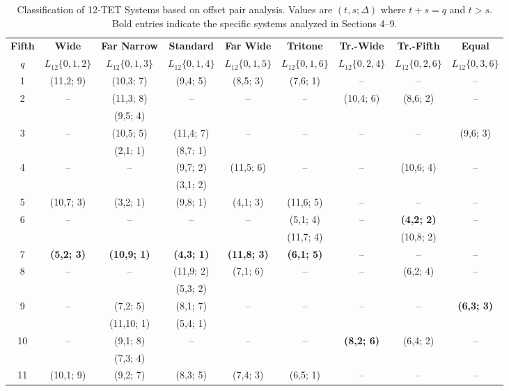 \documentclass[12pt,letterpaper]{amsart}
\begin{document}
\begin{table}[h!]
\centering
\scriptsize
\renewcommand{\arraystretch}{1.5}
\setlength{\tabcolsep}{2pt}
\begin{tabular}{|c||c|c|c|c|c|c|c|c|}
\hline
\textbf{Fifth} & \textbf{Wide} & \textbf{Far Narrow} & \textbf{Standard} & \textbf{Far Wide} & \textbf{Tritone} & \textbf{Tr.-Wide} & \textbf{Tr.-Fifth} & \textbf{Equal} \\
$q$ & $L_{12}\{0,1,2\}$ & $L_{12}\{0,1,3\}$ & $L_{12}\{0,1,4\}$ & $L_{12}\{0,1,5\}$ & $L_{12}\{0,1,6\}$ & $L_{12}\{0,2,4\}$ & $L_{12}\{0,2,6\}$ & $L_{12}\{0,3,6\}$ \\ \hline\hline
1 & (11,2; 9) & (10,3; 7) & (9,4; 5) & (8,5; 3) & (7,6; 1) & -- & -- & -- \\ \hline
2 & -- & (11,3; 8) & -- & -- & -- & (10,4; 6) & (8,6; 2) & -- \\
  &    & (9,5; 4)  &    &    &    &            &           &    \\ \hline
3 & -- & (10,5; 5) & (11,4; 7) & -- & -- & -- & -- & (9,6; 3) \\
  &    & (2,1; 1)   & (8,7; 1)  &    &    &    &    &          \\ \hline
4 & -- & -- & (9,7; 2) & (11,5; 6) & -- & -- & (10,6; 4) & -- \\
  &    &    & (3,1; 2) &           &    &    &           &    \\ \hline
5 & (10,7; 3) & (3,2; 1) & (9,8; 1) & (4,1; 3) & (11,6; 5) & -- & -- & -- \\ \hline
6 & -- & -- & -- & -- & (5,1; 4)  & --  & {\bf (4,2; 2)} & -- \\
  &    &    &    &    & (11,7; 4) &           & (10,8; 2) &    \\ \hline
7 & {\bf (5,2; 3)} & {\bf (10,9; 1)} & {\bf (4,3; 1)} & {\bf (11,8; 3)} & {\bf (6,1; 5)} & -- & -- & -- \\ \hline
8 & -- & -- & (11,9; 2) & (7,1; 6) & -- & -- & (6,2; 4) & -- \\
  &    &           & (5,3; 2)  &           &    &    &          &    \\ \hline
9 & -- & (7,2; 5) & (8,1; 7) & -- & -- & -- & -- & {\bf (6,3; 3)} \\
  &    & (11,10; 1)  & (5,4; 1) &    &    &    &    &          \\ \hline
10 & -- & (9,1; 8)  & -- & -- & -- & {\bf (8,2; 6)} & (6,4; 2) & -- \\
   &    & (7,3; 4) &          &    &    &          &          &    \\ \hline
11 & (10,1; 9) & (9,2; 7) & (8,3; 5) & (7,4; 3) & (6,5; 1) & -- & -- & -- \\ \hline
\end{tabular}
\caption{Classification of 12-TET Systems based on offset pair analysis. Values are $(t, s; \Delta)$ where $t+s=q$ and $t > s$. Bold entries indicate the specific systems analyzed in Sections 4--9.}\label{tab:full_classification_12}
\end{table}
\end{document}
